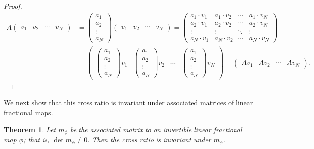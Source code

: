 \documentclass{amsart}
\theoremstyle{theorem}
\newtheorem{theorem}{Theorem}
\theoremstyle{lemma}
\theoremstyle{definition}
\begin{document}
\begin{proof}
\begin{align*}
A\begin{pmatrix}v_1 & v_2 & \cdots & v_N \end{pmatrix}&=\begin{pmatrix}a_1 \\ a_2 \\ \vdots \\ a_N \end{pmatrix}\begin{pmatrix}v_1 & v_2 & \cdots & v_N \end{pmatrix}=
\begin{pmatrix}a_1 \cdot v_1 & a_1 \cdot v_2 & \cdots & a_1 \cdot v_N \\
a_2 \cdot v_1 & a_2 \cdot v_2 &  \cdots & a_2 \cdot v_N \\
 \vdots & \vdots & \ddots & \vdots \\
a_N \cdot v_1 & a_N \cdot v_2 &  \cdots & a_N \cdot v_N 
\end{pmatrix}\\
&=\begin{pmatrix}\begin{pmatrix}a_1 \\ a_2 \\ \vdots \\ a_N \end{pmatrix}v_1 & \begin{pmatrix}a_1 \\ a_2 \\ \vdots \\ a_N \end{pmatrix}v_2 & \cdots & \begin{pmatrix}a_1 \\ a_2\\ \vdots \\ a_N \end{pmatrix}v_N \end{pmatrix}=\begin{pmatrix}Av_1 & Av_2 & \cdots & Av_N \end{pmatrix}.
\end{align*}

\end{proof}

We next show that this cross ratio is invariant under associated matrices of linear fractional maps.

\begin{theorem}
Let $m_{\phi}$ be the associated matrix to an invertible linear fractional map $\phi$; that is, $\det m_{\phi} \neq 0$. Then the cross ratio is invariant under $m_{\phi}$.
\end{theorem}
\end{document}
